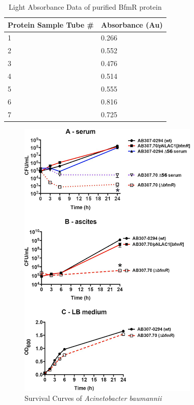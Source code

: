 \documentclass[11pt]{article}
\begin{document}
\begin{table}[htb]
\Centering
\begin{tabular}{@{}ll@{}}
\toprule
\textbf{Protein Sample Tube \#} & \textbf{Absorbance (Au)} \\ \midrule
1                               & 0.266                    \\
2                               & 0.552                    \\
3                               & 0.476                    \\
4                               & 0.514                    \\
5                               & 0.555                    \\
6                               & 0.816                    \\
7                               & 0.725                    \\ \bottomrule
\end{tabular}
\label{table:light-absorbance}
\caption{Light Absorbance Data of purified BfmR protein}
\end{table}


\begin{figure}[hbp]
\centering
\includegraphics[scale=0.7]{survival-curve.png}
\caption{Survival Curves of \emph{Acinetobacter baumannii} \cite{beanan}}
\label{fig:survival-curve-a-baumannii}
\end{figure}
\end{document}
